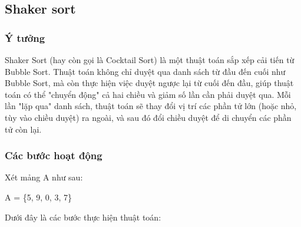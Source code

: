 \subsection{Shaker sort}
\label{subsec:shaker-sort}

\subsubsection{Ý tưởng}
Shaker Sort (hay còn gọi là Cocktail Sort) là một thuật toán sắp xếp cải tiến từ Bubble Sort. Thuật toán không chỉ duyệt qua danh sách từ đầu đến cuối như Bubble Sort, mà còn thực hiện việc duyệt ngược lại từ cuối đến đầu, giúp thuật toán có thể "chuyển động" cả hai chiều và giảm số lần cần phải duyệt qua. Mỗi lần "lặp qua" danh sách, thuật toán sẽ thay đổi vị trí các phần tử lớn (hoặc nhỏ, tùy vào chiều duyệt) ra ngoài, và sau đó đổi chiều duyệt để di chuyển các phần tử còn lại.

\subsubsection{Các bước hoạt động}
Xét mảng A như sau: 
\begin{center}
   A = \{5, 9, 0, 3, 7\} 
\end{center} 
Dưới đây là các bước thực hiện thuật toán:


